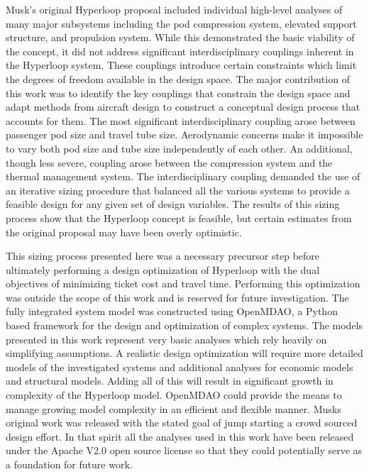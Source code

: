 \documentclass[heading.tex]{subfiles}
\begin{document}
Musk's original Hyperloop proposal included individual high-level analyses of many major subsystems including the pod compression system,
elevated support structure, and propulsion system. While this demonstrated the basic viability of the concept, it did not address
significant interdisciplinary couplings inherent in the Hyperloop system. These couplings introduce certain constraints which limit the 
degrees of freedom available in the design space. The major contribution of this work was to identify the key couplings that constrain the design space
and adapt methods from aircraft design to construct a conceptual design process that accounts for them. The most significant 
interdisciplinary coupling arose between passenger pod size and travel tube size. Aerodynamic concerns make it impossible to vary 
both pod size and tube size independently of each other. An additional, though less severe, coupling arose between the compression system and 
the thermal management system. The interdisciplinary coupling demanded the use of an iterative sizing procedure that balanced 
all the various systems to provide a feasible design for any given set of design variables. The results of this sizing process show that
the Hyperloop concept is feasible, but certain estimates from the original proposal may have been overly optimistic. 

This sizing process presented here was a necessary precursor step before ultimately performing a design optimization of 
Hyperloop with the dual objectives of minimizing ticket cost and travel time. Performing this optimization 
was outside the scope of this work and is reserved for future investigation. 
The fully integrated system model was constructed using OpenMDAO, a Python based framework for 
the design and optimization of complex systems\cite{GrayBenmarking2013}. The models presented 
in this work represent very basic analyses which rely heavily on simplifying assumptions. A realistic design 
optimization will require more detailed models of the investigated systems and additional analyses for economic models and 
structural models. Adding all of this will result in significant growth in complexity of the Hyperloop model. 
OpenMDAO could provide the means to manage growing model complexity 
in an efficient and flexible manner. Musks original work was released with the stated goal of jump starting
a crowd sourced design effort. In that spirit all the analyses used in this work have been released under
the Apache V2.0 open source license so that they could potentially serve as a foundation for future work.
\end{document}
